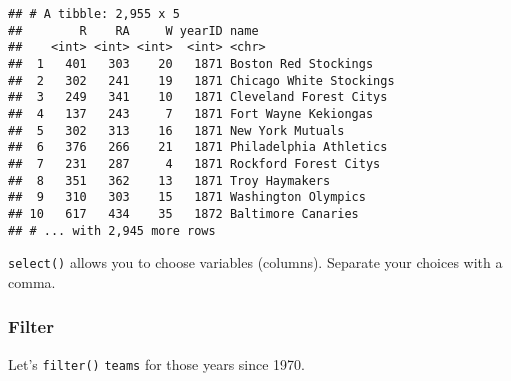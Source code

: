 \documentclass[
]{article}
\newenvironment{Shaded}{\begin{snugshade}}{\end{snugshade}}
\newcommand{\DecValTok}[1]{\textcolor[rgb]{0.00,0.00,0.81}{#1}}
\newcommand{\KeywordTok}[1]{\textcolor[rgb]{0.13,0.29,0.53}{\textbf{#1}}}
\newcommand{\NormalTok}[1]{#1}
\newcommand{\OperatorTok}[1]{\textcolor[rgb]{0.81,0.36,0.00}{\textbf{#1}}}
\newcommand{\StringTok}[1]{\textcolor[rgb]{0.31,0.60,0.02}{#1}}
\begin{document}
\begin{Shaded}
\end{Shaded}

\begin{verbatim}
## # A tibble: 2,955 x 5
##        R    RA     W yearID name                   
##    <int> <int> <int>  <int> <chr>                  
##  1   401   303    20   1871 Boston Red Stockings   
##  2   302   241    19   1871 Chicago White Stockings
##  3   249   341    10   1871 Cleveland Forest Citys 
##  4   137   243     7   1871 Fort Wayne Kekiongas   
##  5   302   313    16   1871 New York Mutuals       
##  6   376   266    21   1871 Philadelphia Athletics 
##  7   231   287     4   1871 Rockford Forest Citys  
##  8   351   362    13   1871 Troy Haymakers         
##  9   310   303    15   1871 Washington Olympics    
## 10   617   434    35   1872 Baltimore Canaries     
## # ... with 2,945 more rows
\end{verbatim}

\texttt{select()} allows you to choose variables (columns). Separate
your choices with a comma.

\hypertarget{filter}{%
\subsubsection{Filter}\label{filter}}

Let's \texttt{filter()} \texttt{teams} for those years since 1970.

\begin{Shaded}
\end{Shaded}
\end{document}
